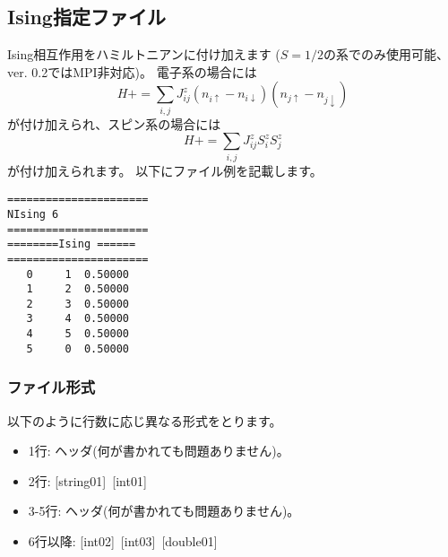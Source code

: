 \newpage
\subsection{Ising指定ファイル}
Ising相互作用をハミルトニアンに付け加えます{ ($S=1/2$の系でのみ使用可能、ver. 0.2ではMPI非対応)}。
電子系の場合には
\begin{equation}
H+=\sum_{i,j}J_{ij}^{z} (n_{i\uparrow}-n_{i\downarrow})(n_{j\uparrow}-n_{j\downarrow} )
\end{equation}
が付け加えられ、スピン系の場合には
\begin{equation}
H+=\sum_{i,j}J_{ij}^{z} S_ {i}^{z}S_{j}^z
\end{equation}
が付け加えられます。
以下にファイル例を記載します。

\begin{minipage}{12.5cm}
\begin{screen}
\begin{verbatim}
====================== 
NIsing 6  
====================== 
========Ising ====== 
====================== 
   0     1  0.50000
   1     2  0.50000
   2     3  0.50000
   3     4  0.50000
   4     5  0.50000
   5     0  0.50000
\end{verbatim}
\end{screen}
\end{minipage}

\subsubsection{ファイル形式}
以下のように行数に応じ異なる形式をとります。
 \begin{itemize}
   \item  1行:  ヘッダ(何が書かれても問題ありません)。
   \item  2行:   [string01]~[int01]
   \item  3-5行:  ヘッダ(何が書かれても問題ありません)。
   \item  6行以降:
   [int02]~[int03]~[double01] 
  \end{itemize}
